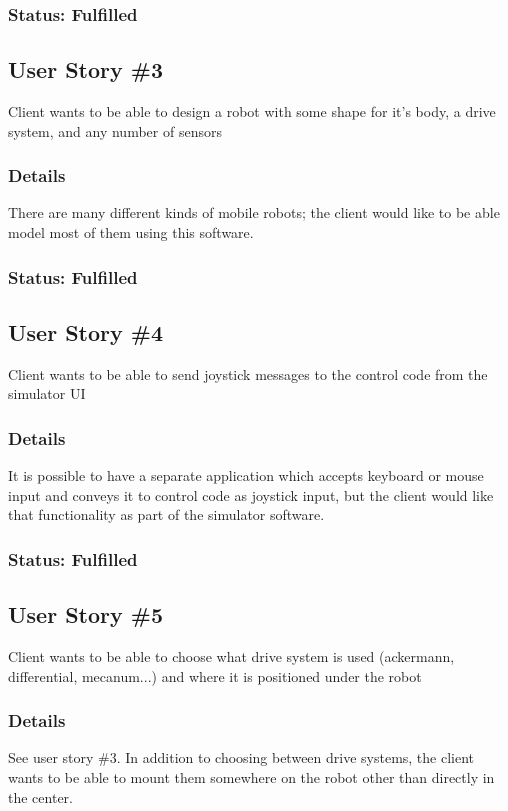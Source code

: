 \subsubsection*{Status: Fulfilled}

\subsection{User Story \#3} 
Client wants to be able to design a robot with some shape for it's body, a drive system, and any number of sensors

\subsubsection*{Details}
There are many different kinds of mobile robots; the client would like to be able model most of them using this software.

\subsubsection*{Status: Fulfilled}

\subsection{User Story \#4} 
Client wants to be able to send joystick messages to the control code from the simulator UI

\subsubsection*{Details}
It is possible to have a separate application which accepts keyboard or mouse input and conveys it to control code as joystick input, but the client would like that functionality as part of the simulator software.

\subsubsection*{Status: Fulfilled}

\subsection{User Story \#5}
Client wants to be able to choose what drive system is used (ackermann, differential, mecanum...) and where it is positioned under the robot

\subsubsection*{Details}
See user story \#3. In addition to choosing between drive systems, the client wants to be able to mount them somewhere on the robot other than directly in the center.

